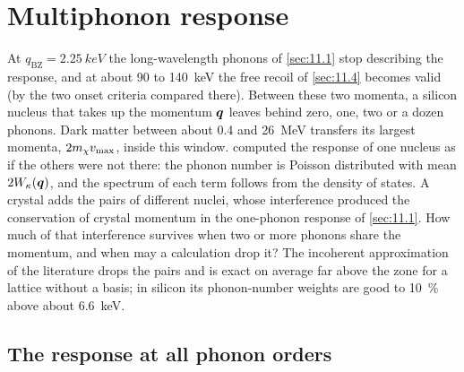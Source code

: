 \section{Multiphonon response}\label{sec:11.3}

At $q_{\mathrm{BZ}} = \SI{2.25}{keV}$ the long-wavelength phonons of \cref{sec:11.1} stop describing the response, and at about 90 to \SI{140}{keV} the free recoil of \cref{sec:11.4} becomes valid (by the two onset criteria compared there). Between these two momenta, a silicon nucleus that takes up the momentum $\bm{q}$ leaves behind zero, one, two or a dozen phonons. Dark matter between about 0.4 and \SI{26}{MeV} transfers its largest momenta, $2m_{\chi} v_{\mathrm{max}}$, inside this window.  computed the response of one nucleus as if the others were not there: the phonon number is Poisson distributed with mean $2W_\kappa(\bm{q})$, and the spectrum of each term follows from the density of states. A crystal adds the pairs of different nuclei, whose interference produced the conservation of crystal momentum in the one-phonon response of \cref{sec:11.1}. How much of that interference survives when two or more phonons share the momentum, and when may a calculation drop it? The incoherent approximation of the literature drops the pairs and is exact on average far above the zone for a lattice without a basis; in silicon its phonon-number weights are good to \SI{10}{\percent} above about \SI{6.6}{keV}.

\subsection{The response at all phonon orders}


